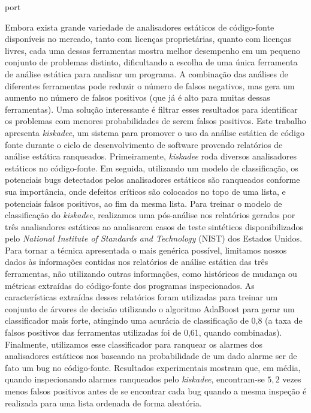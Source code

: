\begin{resumo}{port}

Embora exista grande variedade de analisadores estáticos de código-fonte
disponíveis no mercado, tanto com licenças proprietárias, quanto com licenças
livres, cada uma dessas ferramentas mostra melhor desempenho em um pequeno
conjunto de problemas distinto, dificultando a escolha de uma única ferramenta de
análise estática para analisar um programa. A combinação das análises de
diferentes ferramentas pode reduzir o número de falsos negativos, mas gera um
aumento no número de falsos positivos (que já é alto para muitas dessas
ferramentas). Uma solução interessante é filtrar esses resultados para
identificar os problemas com menores probabilidades de serem falsos
positivos.
Este trabalho apresenta \textit{kiskadee}, um sistema para promover o uso da
análise estática de código fonte durante o ciclo de desenvolvimento de
software provendo relatórios de análise estática ranqueados. Primeiramente,
\textit{kiskadee} roda diversos analisadores estáticos no código-fonte. Em seguida,
utilizando um modelo de classificação, os potenciais bugs detectados pelos
analisadores estáticos são ranqueados conforme sua importância, onde defeitos
críticos são colocados no topo de uma lista, e potenciais falsos positivos,
ao fim da mesma lista.
Para treinar o modelo de classificação do \textit{kiskadee}, realizamos uma
pós-análise nos relatórios gerados por três analisadores estáticos ao
analisarem casos de teste sintéticos disponibilizados pelo \textit{National
Institute of Standards and Technology} (NIST) dos Estados Unidos. Para tornar
a técnica apresentada o mais genérica possível, limitamos nossos dados às
informações contidas nos relatórios de análise estática das três ferramentas,
não utilizando outras informações, como históricos de mudança ou métricas
extraídas do código-fonte dos programas inspecionados. As características
extraídas desses relatórios foram utilizadas para treinar um conjunto de
árvores de decisão utilizando o algoritmo AdaBoost para gerar um
classificador mais forte, atingindo uma acurácia de classificação de 0,8 (a
taxa de falsos positivos das ferramentas utilizadas foi de 0,61, quando
combinadas). Finalmente, utilizamos esse classificador para ranquear os
alarmes dos analisadores estáticos nos baseando na probabilidade de um dado
alarme ser de fato um bug no código-fonte. Resultados experimentais
mostram que, em média, quando inspecionando alarmes ranqueados pelo \textit{kiskadee},
encontram-se $5,2$ vezes menos falsos positivos antes de se encontrar cada bug
quando a mesma inspeção é realizada para uma lista ordenada de forma aleatória.

\end{resumo}

